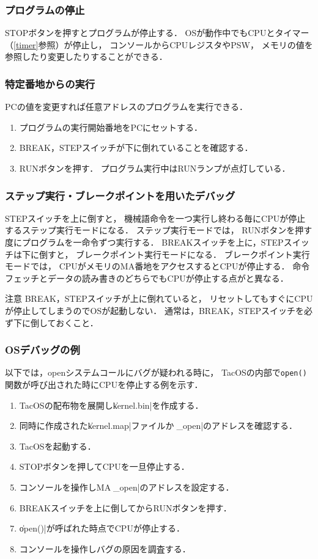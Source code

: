 \subsubsection{プログラムの停止}
STOPボタンを押すとプログラムが停止する．
OSが動作中でもCPUとタイマー（\ref{timer}参照）が停止し，
コンソールからCPUレジスタやPSW，
メモリの値を参照したり変更したりすることができる．

\subsubsection{特定番地からの実行}
PCの値を変更すれば任意アドレスのプログラムを実行できる．

\begin{enumerate}
\item プログラムの実行開始番地をPCにセットする．
\item BREAK，STEPスイッチが下に倒れていることを確認する．
\item RUNボタンを押す．
  プログラム実行中はRUNランプが点灯している．
\end{enumerate}

\subsubsection{ステップ実行・ブレークポイントを用いたデバッグ}
STEPスイッチを上に倒すと，
機械語命令を一つ実行し終わる毎にCPUが停止するステップ実行モードになる．
ステップ実行モードでは，
RUNボタンを押す度にプログラムを一命令ずつ実行する．
BREAKスイッチを上に，STEPスイッチは下に倒すと，
ブレークポイント実行モードになる．
ブレークポイント実行モードでは，
CPUがメモリのMA番地をアクセスするとCPUが停止する．
命令フェッチとデータの読み書きのどちらでもCPUが停止する点が{\tec}と異なる．

\begin{itembox}[l]{注意}
  BREAK，STEPスイッチが上に倒れていると，
  リセットしてもすぐにCPUが停止してしまうのでOSが起動しない．
  通常は，BREAK，STEPスイッチを必ず下に倒しておくこと．
\end{itembox}

\subsubsection{OSデバッグの例}
以下では，openシステムコールにバグが疑われる時に，
TacOSの内部で\texttt{open()}関数が呼び出された時にCPUを停止する例を示す．

\begin{enumerate}
\item TacOSの配布物を展開し\|kernel.bin|を作成する．
\item 同時に作成された\|kernel.map|ファイルから\|_open|のアドレスを確認する．
\item TacOSを起動する．
\item STOPボタンを押してCPUを一旦停止する．
\item コンソールを操作しMAに\|_open|のアドレスを設定する．
\item BREAKスイッチを上に倒してからRUNボタンを押す．
\item \|open()|が呼ばれた時点でCPUが停止する．
\item コンソールを操作しバグの原因を調査する．
\end{enumerate}
